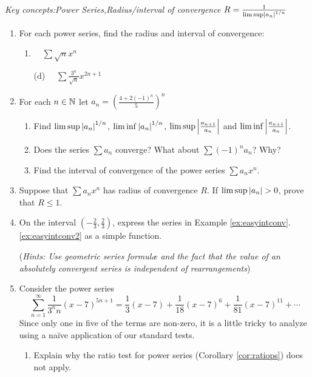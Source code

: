 \begin{exercises}
	\emph{Key concepts:\quad Power Series,\quad Radius/interval of convergence $R=\frac 1{\limsup\left| a_n\right|^{1/n}}$}
	
	\begin{enumerate}
		\item For each power series, find the radius and interval of convergence:
		\begin{enumerate}
		  \item {}\
			\
			$\displaystyle\sum\sqrt nx^n$
			\item[(d)] \
			\
			$\displaystyle\sum\frac{3^n}{\sqrt n}x^{2n+1}$
		\end{enumerate}
	  
	  
	  \item For each $n\in\mathbb{N}$ let $a_n=\left(\frac{4+2(-1)^n}{5}\right)^n$
	  \begin{enumerate}
	    \item Find $\limsup\left| a_n\right|^{1/n}$, $\liminf\left| a_n\right|^{1/n}$, $\limsup\left| \frac{a_{n+1}}{a_n}\right|$ and $\liminf\left| \frac{a_{n+1}}{a_n}\right|$.
	    \item Does the series $\sum a_n$ converge? What about $\sum (-1)^na_n$? Why?
	    \item Find the interval of convergence of the power series $\sum a_nx^n$.
	  \end{enumerate}
	  
	  
	  \item Suppose that $\sum a_nx^n$ has radius of convergence $R$. If $\limsup\nm{a_n}>0$, prove that $R\le 1$.
	  
	  
	  \item On the interval $(-\frac 23,\frac 23)$, express the series in Example \ref*{ex:easyintconv}.\ref{ex:easyintconv2} as a simple function.\par
	  (\emph{Hints: Use geometric series formulæ and the fact that the value of an absolutely convergent series is independent of rearrangements}) 
	  
	  
		\item Consider the power series
		\[
			\sum_{n=1}^\infty \frac{1}{3^nn}(x-7)^{5n+1} 
			=\frac 13(x-7)+\frac 1{18}(x-7)^6+\frac 1{81}(x-7)^{11}+\cdots 
		\]
		Since only one in five of the terms are non-zero, it is a little tricky to analyze using a naïve application of our standard tests.
		\begin{enumerate}
		  \item Explain why the ratio test for power series (Corollary \ref{cor:ratiops}) does not apply.
		  

\end{enumerate}
\end{enumerate}
\end{exercises}
